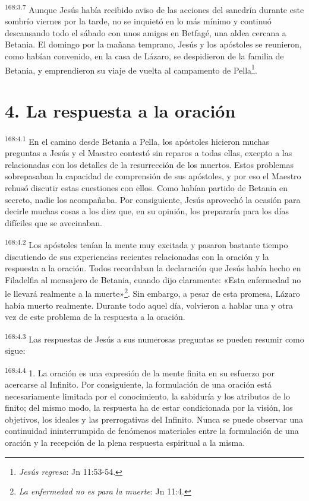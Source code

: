 \par
\textsuperscript{168:3.7} Aunque Jesús había recibido aviso de las acciones del sanedrín durante este sombrío viernes por la tarde, no se inquietó en lo más mínimo y continuó descansando todo el sábado con unos amigos en Betfagé, una aldea cercana a Betania. El domingo por la mañana temprano, Jesús y los apóstoles se reunieron, como habían convenido, en la casa de Lázaro, se despidieron de la familia de Betania, y emprendieron su viaje de vuelta al campamento de Pella\footnote{\textit{Jesús regresa}: Jn 11:53-54.}.

\section*{4. La respuesta a la oración}
\par
\textsuperscript{168:4.1} En el camino desde Betania a Pella, los apóstoles hicieron muchas preguntas a Jesús y el Maestro contestó sin reparos a todas ellas, excepto a las relacionadas con los detalles de la resurrección de los muertos. Estos problemas sobrepasaban la capacidad de comprensión de sus apóstoles, y por eso el Maestro rehusó discutir estas cuestiones con ellos. Como habían partido de Betania en secreto, nadie los acompañaba. Por consiguiente, Jesús aprovechó la ocasión para decirle muchas cosas a los diez que, en su opinión, los prepararía para los días difíciles que se avecinaban.

\par
\textsuperscript{168:4.2} Los apóstoles tenían la mente muy excitada y pasaron bastante tiempo discutiendo de sus experiencias recientes relacionadas con la oración y la respuesta a la oración. Todos recordaban la declaración que Jesús había hecho en Filadelfia al mensajero de Betania, cuando dijo claramente: «Esta enfermedad no le llevará realmente a la muerte»\footnote{\textit{La enfermedad no es para la muerte}: Jn 11:4.}. Sin embargo, a pesar de esta promesa, Lázaro había muerto realmente. Durante todo aquel día, volvieron a hablar una y otra vez de este problema de la respuesta a la oración.

\par
\textsuperscript{168:4.3} Las respuestas de Jesús a sus numerosas preguntas se pueden resumir como sigue:

\par
\textsuperscript{168:4.4} 1. La oración es una expresión de la mente finita en su esfuerzo por acercarse al Infinito. Por consiguiente, la formulación de una oración está necesariamente limitada por el conocimiento, la sabiduría y los atributos de lo finito; del mismo modo, la respuesta ha de estar condicionada por la visión, los objetivos, los ideales y las prerrogativas del Infinito. Nunca se puede observar una continuidad ininterrumpida de fenómenos materiales entre la formulación de una oración y la recepción de la plena respuesta espiritual a la misma.

